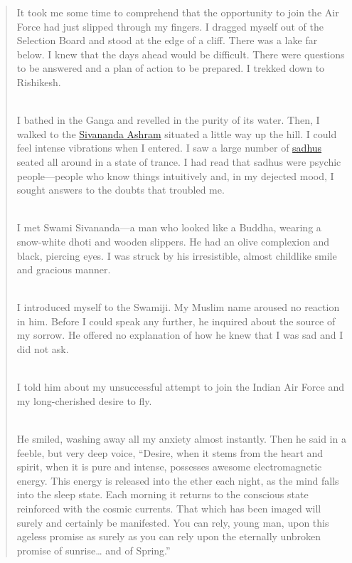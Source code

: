 \documentclass[
  a4paper,
]{article}
\begin{document}
\begin{quote}
It took me some time to comprehend that the opportunity to join the Air
Force had just slipped through my fingers. I dragged myself out of the
Selection Board and stood at the edge of a cliff. There was a lake far
below. I knew that the days ahead would be difficult. There were
questions to be answered and a plan of action to be prepared. I trekked
down to Rishikesh.\\
\strut \\
I bathed in the Ganga and revelled in the purity of its water. Then, I
walked to the
\href{https://en.wikipedia.org/wiki/Divine_Life_Society}{Sivananda
Ashram} situated a little way up the hill. I could feel intense
vibrations when I entered. I saw a large number of
\href{https://en.wikipedia.org/wiki/Sadhu}{sadhus} seated all around in
a state of trance. I had read that sadhus were psychic people---people
who know things intuitively and, in my dejected mood, I sought answers
to the doubts that troubled me.\\
\strut \\
I met Swami Sivananda---a man who looked like a Buddha, wearing a
snow-white dhoti and wooden slippers. He had an olive complexion and
black, piercing eyes. I was struck by his irresistible, almost childlike
smile and gracious manner.\\
\strut \\
I introduced myself to the Swamiji. My Muslim name aroused no reaction
in him. Before I could speak any further, he inquired about the source
of my sorrow. He offered no explanation of how he knew that I was sad
and I did not ask.\\
\strut \\
I told him about my unsuccessful attempt to join the Indian Air Force
and my long-cherished desire to fly.\\
\strut \\
He smiled, washing away all my anxiety almost instantly. Then he said in
a feeble, but very deep voice, ``Desire, when it stems from the heart
and spirit, when it is pure and intense, possesses awesome
electromagnetic energy. This energy is released into the ether each
night, as the mind falls into the sleep state. Each morning it returns
to the conscious state reinforced with the cosmic currents. That which
has been imaged will surely and certainly be manifested. You can rely,
young man, upon this ageless promise as surely as you can rely upon the
eternally unbroken promise of sunrise\ldots{} and of Spring.''\\

\end{quote}
\end{document}
